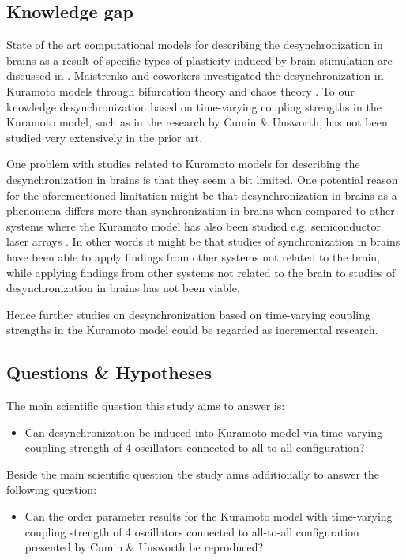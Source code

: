 \documentclass{article}
\begin{document}
\subsection{Knowledge gap}
State of the art computational models for describing the desynchronization in brains as a result of specific types of plasticity induced by brain stimulation are discussed in \cite{Manos}. Maistrenko and coworkers investigated the desynchronization in Kuramoto models through bifurcation theory and chaos theory \cite{Maistrenko}. To our knowledge desynchronization based on time-varying coupling strengths in the Kuramoto model, such as in the research by Cumin \& Unsworth\cite{Cumin}, has not been studied very extensively in the prior art. 

One problem with studies related to Kuramoto models for describing the desynchronization in brains is that they seem a bit limited. One potential reason for the aforementioned limitation might be that desynchronization in brains as a phenomena differs more than synchronization in brains when compared to other systems where the Kuramoto model has also been studied e.g. semiconductor laser arrays \cite{Maistrenko}. In other words it might be that studies of synchronization in brains have been able to apply findings from other systems not related to the brain, while applying findings from other systems not related to the brain to studies of desynchronization in brains has not been viable. 

Hence further studies on desynchronization based on time-varying coupling strengths in the Kuramoto model could be regarded as incremental research.

\subsection{Questions \& Hypotheses}

The main scientific question this study aims to answer is:
\begin{itemize}
    \item Can desynchronization be induced into Kuramoto model via time-varying coupling strength of 4 oscillators connected to all-to-all configuration?
\end{itemize}

Beside the main scientific question the study aims additionally to answer the following question:
\begin{itemize}
    \item Can the order parameter results for the Kuramoto model with time-varying coupling strength of 4 oscillators connected to all-to-all configuration presented by Cumin \& Unsworth \cite{Cumin} be reproduced?
\end{itemize}
\end{document}
